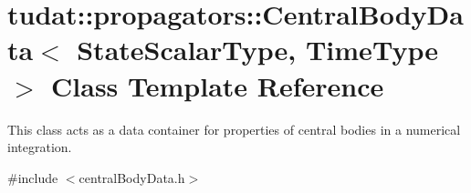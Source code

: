 \hypertarget{classtudat_1_1propagators_1_1CentralBodyData}{}\section{tudat\+:\+:propagators\+:\+:Central\+Body\+Data$<$ State\+Scalar\+Type, Time\+Type $>$ Class Template Reference}
\label{classtudat_1_1propagators_1_1CentralBodyData}


This class acts as a data container for properties of central bodies in a numerical integration.  




{\ttfamily \#include $<$central\+Body\+Data.\+h$>$}

